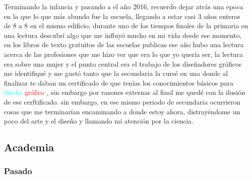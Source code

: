\documentclass[letterpaper, 12pt]{article}
\begin{document}
    
    Terminando la infancia %
    y pasando a el año 2016, recuerdo dejar atrás una epoca en la que lo que más abundo fue la escuela, llegando a estar casi 3 años enteros de 8 a 8 en el mismo edificio, durante uno de los tiempos finales de la primaria en una lectura descubrí algo que me influyó mucho en mi vida desde ese momento, %
    en los libros de texto gratuitos de las escuelas publicas ese año hubo una lectura acerca de las profesiones que me hizo ver que era lo que yo quería ser, la lectura era sobre una mujer y el punto central era el trabajo de los diseñadores gráficos %
    me identifiqué y me gustó tanto que la secundaria la cursé en una donde al finalizar te daban un certificado de que tenías los conocimientos básicos para 
    {\textcolor{cyan}{diseño}}
    {\textcolor{red}{gr\'afico}}
    , sin embargo por razones externas %
    al final me quedé con la ilusión de ese cerftificado. %
    sin embargo, en ese mismo periodo de secundaria ocurrieron cosas que me terminarían encaminando a donde estoy ahora, distrayéndome un poco del arte y el diseño y llamando mi atención por la ciencia.%
    
    
    \subsection*{Academia}
        \subsubsection*{Pasado}
        
\end{document}
